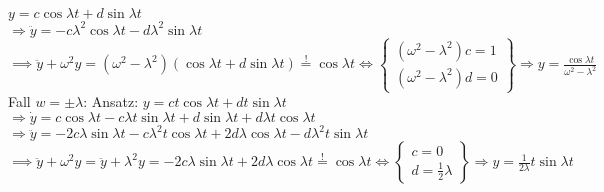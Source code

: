 \documentclass[12pt,a4paper,titlepage]{article}
\begin{document}
$y=c\cos\lambda t+d\sin\lambda t$ \\
$\Rightarrow \ddot y=-c\lambda^2\cos\lambda t-d\lambda^2\sin\lambda t $ \\
$\implies \ddot y+\omega^2y=(\omega^2-\lambda^2)(\cos\lambda t+d\sin\lambda t) \overset{!}{=} \cos\lambda t \iff \left\{\begin{array}{l}(\omega^2-\lambda^2)c=1 \\ (\omega^2-\lambda^2)d=0\end{array}\right\} \Rightarrow y=\frac{\cos\lambda t}{\omega^2-\lambda^2}$ \\
Fall $w=\pm\lambda$: Ansatz: $y=ct\cos\lambda t+dt\sin\lambda t $ \\
$\Rightarrow \dot y=c\cos\lambda t-c\lambda t\sin\lambda t+d\sin\lambda t+d\lambda t\cos\lambda t$\\
$\Rightarrow \ddot y=-2c\lambda\sin\lambda t-c\lambda^2t\cos\lambda t+2d\lambda\cos\lambda t-d\lambda^2t\sin\lambda t$ \\
$\implies \ddot y+\omega^2y=\ddot y+\lambda^2 y=-2c\lambda\sin\lambda t+2d\lambda\cos\lambda t \overset{!}{=} \cos\lambda t \iff \left\{\begin{array}{l}c=0 \\ d=\frac{1}{2}\lambda\end{array}\right\} \Rightarrow y=\frac{1}{2\lambda}t\sin\lambda t$
\end{document}

